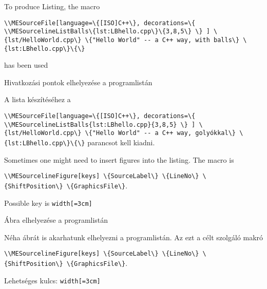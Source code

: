 {
To produce Listing\ao{ \ref{lst:LBhello.cpp}}, the macro

\par\noindent\lstinline|\\MESourceFile[language=\{[ISO]C++\},
decorations=\{
\\MESourcelineListBalls\{lst:LBhello.cpp\}\{3,8,5\}
\}
] \{lst/HelloWorld.cpp\} \{"Hello World" -- a C++ way, with balls\} \{lst:LBhello.cpp\}\{\}|
\par\noindent has been used

}
{Hivatkozási pontok elhelyezése a programlistán}
{
A \ao{\ref{lst:LBhello.cpp}} lista készítéséhez a
\par\noindent\lstinline|\\MESourceFile[language=\{[ISO]C++\},
decorations=\{
\\MESourcelineListBalls{lst:LBhello.cpp}{3,8,5}
\}
] \{lst/HelloWorld.cpp\} \{"Hello World" -- a C++ way, golyókkal\} \{lst:LBhello.cpp\}\{\}|
parancsot kell kiadni.

}



{
Sometimes one might need to insert figures into the listing.
The macro is
\par\noindent\lstinline|\\MESourcelineFigure[keys] \{SourceLabel\} \{LineNo\} \{ShiftPosition\} \{GraphicsFile\}|.
\par\noindent Possible key is \lstinline|width[=3cm]|

}
{Ábra elhelyezése a programlistán}
{
Néha ábrát is akarhatunk elhelyezni a programlistán.
Az ezt a célt szolgáló makró
\par\noindent\lstinline|\\MESourcelineFigure[keys] \{SourceLabel\} \{LineNo\} \{ShiftPosition\} \{GraphicsFile\}|.
\par\noindent Lehetséges kulcs: \lstinline|width[=3cm]|
}

